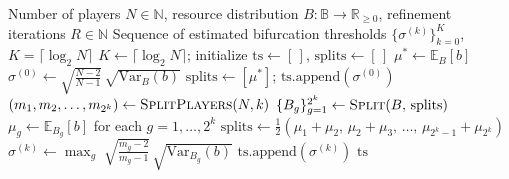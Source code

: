 \documentclass{article}
\begin{document}
                \begin{algorithm}[ht!]
                \caption{Bifurcation Threshold Estimation}\label{alg:SI_t_estimate}
                \begin{algorithmic}[1]
                \Require Number of players $N \in \mathbb{N}$, resource distribution $B : 
                    \mathbb{B} \to \mathbb{R}_{\geq 0}$, refinement iterations $R \in \mathbb{N}$
                \Ensure Sequence of estimated bifurcation thresholds 
                    $\{\sigma^{(k)}\}_{k=0}^{K}$, $K = \lceil \log_2 N \rceil$
                \State $K \leftarrow \lceil \log_2 N \rceil$; initialize 
                    $\mathrm{ts} \leftarrow [\,]$, 
                    $\mathrm{splits} \leftarrow [\,]$
                        \State$\mu^* \leftarrow \mathbb{E}_B[b]$ 
                        \State$\sigma^{(0)} \leftarrow \sqrt{\tfrac{N-2}{N-1}}\,
                            \sqrt{\mathrm{Var}_B(b)}$
                        \State$\mathrm{splits} \leftarrow [\mu^*]$; 
                            $\mathrm{ts}.\mathrm{append}(\sigma^{(0)})$
                    \Else
                        \State$(m_1, m_2, \ldots, m_{2^k}) \leftarrow 
                            \textsc{SplitPlayers}(N, k)$
                            \State$\{B_g\}_{g=1}^{2^k} \leftarrow 
                                \textsc{Split}(B,\, \mathrm{splits})$
                            \State$\mu_g \leftarrow \mathbb{E}_{B_g}[b]$ 
                                for each $g = 1, \ldots, 2^k$
                            \State$\mathrm{splits} \leftarrow 
                                \tfrac{1}{2}(\mu_1 + \mu_2,\, \mu_2 + \mu_3,\, \ldots,\, 
                                \mu_{2^k - 1} + \mu_{2^k})$
                        \EndFor
                        \State$\sigma^{(k)} \leftarrow \max_{g}\; 
                            \sqrt{\tfrac{m_g - 2}{m_g - 1}}\,\sqrt{\mathrm{Var}_{B_g}(b)}$
                        \State$\mathrm{ts}.\mathrm{append}(\sigma^{(k)})$
                    \EndIf
                \EndFor
                \State\Return $\mathrm{ts}$
                \end{algorithmic}
                \end{algorithm}
\end{document}
